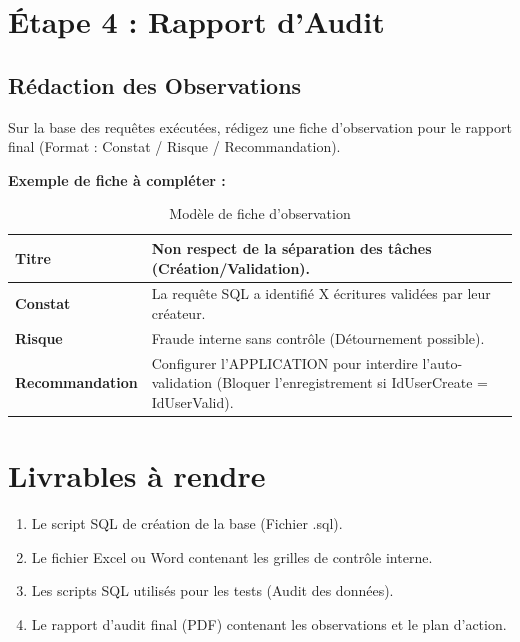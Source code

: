 \section{Étape 4 : Rapport d'Audit}

\subsection{Rédaction des Observations}

Sur la base des requêtes exécutées, rédigez une fiche d'observation pour le rapport final (Format : Constat / Risque / Recommandation).

\textbf{Exemple de fiche à compléter :}

\begin{table}[h!]
\centering
\small
\begin{tabular}{|p{3cm}|p{9cm}|}
    \hline
    \textbf{Titre} & Non respect de la séparation des tâches (Création/Validation). \\
    \hline
    \textbf{Constat} & La requête SQL a identifié X écritures validées par leur créateur. \\
    \hline
    \textbf{Risque} & Fraude interne sans contrôle (Détournement possible). \\
    \hline
    \textbf{Recommandation} & Configurer l'APPLICATION pour interdire l'auto-validation (Bloquer l'enregistrement si IdUserCreate = IdUserValid). \\
    \hline
\end{tabular}
\caption{Modèle de fiche d'observation}
\end{table}

\section{Livrables à rendre}

\begin{enumerate}
    \item Le script SQL de création de la base (Fichier .sql).
    \item Le fichier Excel ou Word contenant les grilles de contrôle interne.
    \item Les scripts SQL utilisés pour les tests (Audit des données).
    \item Le rapport d'audit final (PDF) contenant les observations et le plan d'action.
\end{enumerate}
